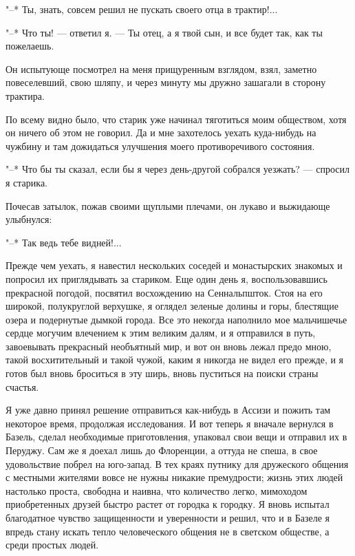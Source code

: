 "--* Ты, знать, совсем решил не пускать своего отца в трактир!...

"--* Что  ты! --- ответил я.  --- Ты отец, а  я твой сын, и  все будет
так, как ты пожелаешь.

Он  испытующе посмотрел  на меня  прищуренным взглядом,  взял, заметно
повеселевший, свою шляпу, и через  минуту мы дружно зашагали в сторону
трактира.

По  всему  видно   было,  что  старик  уже   начинал  тяготиться  моим
обществом, хотя  он ничего  об этом  не говорил.  Да и  мне захотелось
уехать  куда-нибудь  на  чужбину  и  там  дожидаться  улучшения  моего
противоречивого состояния.

"--* Что бы  ты сказал, если бы я через  день-другой собрался уезжать?
--- спросил я старика.

Почесав затылок, пожав  своими щуплыми плечами, он  лукаво и выжидающе
улыбнулся:

"--* Так ведь тебе видней!...

Прежде  чем  уехать,  я  навестил нескольких  соседей  и  монастырских
знакомых  и  попросил  их  приглядывать за  стариком.  Еще  один  день
я,  воспользовавшись  прекрасной   погодой,  посвятил  восхождению  на
Сеннальпшток.  Стоя на  его широкой,  полукруглой верхушке,  я оглядел
зеленые долины и горы, блестящие озера и подернутые дымкой города. Все
это  некогда  наполнило мое  мальчишечье  сердце  могучим влечением  к
этим  великим далям,  и я  отправился в  путь, завоевывать  прекрасный
необъятный мир, и вот он  вновь лежал предо мною, такой восхитительный
и такой  чужой, каким  я никогда не  видел его прежде,  и я  готов был
вновь броситься в эту ширь, вновь пуститься на поиски страны счастья.

Я уже  давно принял решение  отправиться как-нибудь в Ассизи  и пожить
там некоторое  время, продолжая исследования.  И вот теперь  я вначале
вернулся  в Базель,  сделал необходимые  приготовления, упаковал  свои
вещи и  отправил их в  Перуджу. Сам же я  доехал лишь до  Флоренции, а
оттуда не спеша, в свое удовольствие  побрел на юго-запад. В тех краях
путнику  для дружеского  общения с  местными жителями  вовсе не  нужны
никакие  премудрости; жизнь  этих людей  настолько проста,  свободна и
наивна, что  количество легко,  мимоходом приобретенных  друзей быстро
растет  от городка  к  городку. Я  вновь  испытал благодатное  чувство
защищенности и  уверенности и  решил, что  и в  Базеле я  впредь стану
искать тепло  человеческого общения  не в  светском обществе,  а среди
простых людей.

